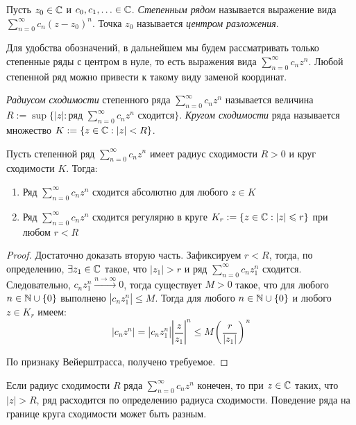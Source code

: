 \begin{definition}
	Пусть $z_0 \in \mathbb{C}$ и $c_0, c_1, \dotsc \in \mathbb{C}$. \textit{Степенным рядом} называется выражение вида $\sum_{n=0}^\infty c_n(z - z_0)^n$. Точка $z_0$ называется \textit{центром разложения}.
\end{definition}

\begin{note}
	Для удобства обозначений, в дальнейшем мы будем рассматривать только степенные ряды с центром в нуле, то есть выражения вида $\sum_{n=0}^\infty c_nz^n$. Любой степенной ряд можно привести к такому виду заменой координат.
\end{note}

\pagebreak

\begin{definition}
	\textit{Радиусом сходимости} степенного ряда $\sum_{n=0}^\infty c_nz^n$ называется величина $R := \sup\{|z| : \text{ряд }\sum_{n=0}^\infty c_nz^n\text{ сходится}\}$. \textit{Кругом сходимости} ряда называется множество $K := \{z \in \mathbb{C} : |z| < R\}$.
\end{definition}

\begin{theorem}[Абеля]
	Пусть степенной ряд $\sum_{n=0}^\infty c_nz^n$ имеет радиус сходимости $R > 0$ и круг сходимости $K$. Тогда:
	\begin{enumerate}
		\item Ряд $\sum_{n=0}^\infty c_nz^n$ сходится абсолютно для любого $z \in K$
		\item Ряд $\sum_{n=0}^\infty c_nz^n$ сходится регулярно в круге $K_r := \{z \in \mathbb{C}: |z| \leqslant r\}$ при любом $r < R$
	\end{enumerate}
\end{theorem}

\begin{proof}
	Достаточно доказать вторую часть. Зафиксируем $r < R$, тогда, по определению, $\exists z_1 \in \mathbb{C}$ такое, что $|z_1| > r$ и ряд $\sum_{n=0}^\infty c_nz_1^n$ сходится. Следовательно, $c_nz_1^n \xrightarrow{n \to \infty} 0$, тогда существует $M > 0$ такое, что для любого $n \in \mathbb{N} \cup \{0\}$ выполнено $|c_nz_1^n| \le M$. Тогда для любого $n \in \mathbb{N} \cup \{0\}$ и любого $z \in K_r$ имеем:
	\[\left|c_nz^n\right| = \left|c_nz_1^n\right|\left|\frac{z}{z_1}\right|^n \le M\left(\frac{r}{|z_1|}\right)^n\]
	
	По признаку Вейерштрасса, получено требуемое.
\end{proof}

\begin{note}
	Если радиус сходимости $R$ ряда $\sum_{n=0}^\infty c_nz^n$ конечен, то при $z \in \mathbb{C}$ таких, что $|z| > R$, ряд расходится по определению радиуса сходимости. Поведение ряда на границе круга сходимости может быть разным.
\end{note}

